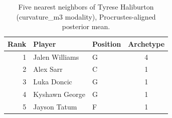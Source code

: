 \begin{table}[htbp]
  \centering\small
  \begin{tabular}{rllc}
    \toprule
    Rank & Player & Position & Archetype \\
    \midrule
    1 & Jalen Williams & G & 4 \\
    2 & Alex Sarr & C & 1 \\
    3 & Luka Doncic & G & 1 \\
    4 & Kyshawn George & G & 1 \\
    5 & Jayson Tatum & F & 1 \\
    \bottomrule
  \end{tabular}
  \caption{Five nearest neighbors of Tyrese Haliburton (curvature_m3 modality), Procrustes-aligned posterior mean.}
  \label{tab:Tyrese_Haliburton_neighbors_curvature_m3}
\end{table}

